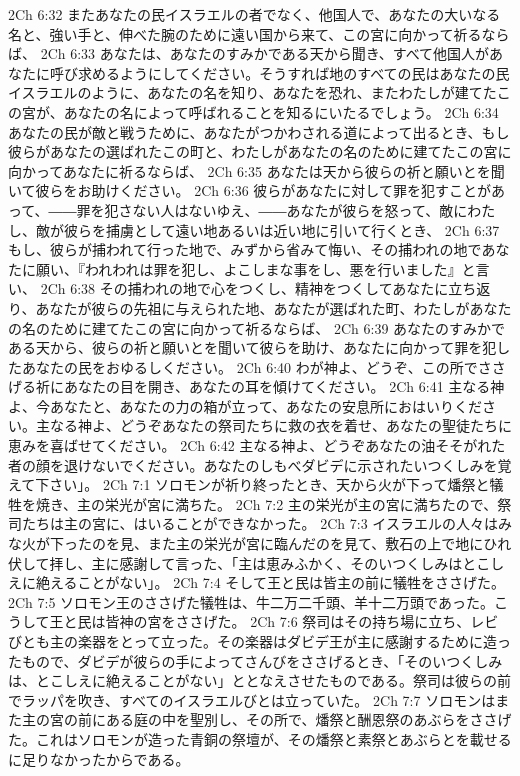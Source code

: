 2Ch 6:32  またあなたの民イスラエルの者でなく、他国人で、あなたの大いなる名と、強い手と、伸べた腕のために遠い国から来て、この宮に向かって祈るならば、
2Ch 6:33  あなたは、あなたのすみかである天から聞き、すべて他国人があなたに呼び求めるようにしてください。そうすれば地のすべての民はあなたの民イスラエルのように、あなたの名を知り、あなたを恐れ、またわたしが建てたこの宮が、あなたの名によって呼ばれることを知るにいたるでしょう。
2Ch 6:34  あなたの民が敵と戦うために、あなたがつかわされる道によって出るとき、もし彼らがあなたの選ばれたこの町と、わたしがあなたの名のために建てたこの宮に向かってあなたに祈るならば、
2Ch 6:35  あなたは天から彼らの祈と願いとを聞いて彼らをお助けください。
2Ch 6:36  彼らがあなたに対して罪を犯すことがあって、――罪を犯さない人はないゆえ、――あなたが彼らを怒って、敵にわたし、敵が彼らを捕虜として遠い地あるいは近い地に引いて行くとき、
2Ch 6:37  もし、彼らが捕われて行った地で、みずから省みて悔い、その捕われの地であなたに願い、『われわれは罪を犯し、よこしまな事をし、悪を行いました』と言い、
2Ch 6:38  その捕われの地で心をつくし、精神をつくしてあなたに立ち返り、あなたが彼らの先祖に与えられた地、あなたが選ばれた町、わたしがあなたの名のために建てたこの宮に向かって祈るならば、
2Ch 6:39  あなたのすみかである天から、彼らの祈と願いとを聞いて彼らを助け、あなたに向かって罪を犯したあなたの民をおゆるしください。
2Ch 6:40  わが神よ、どうぞ、この所でささげる祈にあなたの目を開き、あなたの耳を傾けてください。
2Ch 6:41  主なる神よ、今あなたと、あなたの力の箱が立って、あなたの安息所におはいりください。主なる神よ、どうぞあなたの祭司たちに救の衣を着せ、あなたの聖徒たちに恵みを喜ばせてください。
2Ch 6:42  主なる神よ、どうぞあなたの油そそがれた者の顔を退けないでください。あなたのしもべダビデに示されたいつくしみを覚えて下さい」。
2Ch 7:1  ソロモンが祈り終ったとき、天から火が下って燔祭と犠牲を焼き、主の栄光が宮に満ちた。
2Ch 7:2  主の栄光が主の宮に満ちたので、祭司たちは主の宮に、はいることができなかった。
2Ch 7:3  イスラエルの人々はみな火が下ったのを見、また主の栄光が宮に臨んだのを見て、敷石の上で地にひれ伏して拝し、主に感謝して言った、「主は恵みふかく、そのいつくしみはとこしえに絶えることがない」。
2Ch 7:4  そして王と民は皆主の前に犠牲をささげた。
2Ch 7:5  ソロモン王のささげた犠牲は、牛二万二千頭、羊十二万頭であった。こうして王と民は皆神の宮をささげた。
2Ch 7:6  祭司はその持ち場に立ち、レビびとも主の楽器をとって立った。その楽器はダビデ王が主に感謝するために造ったもので、ダビデが彼らの手によってさんびをささげるとき、「そのいつくしみは、とこしえに絶えることがない」ととなえさせたものである。祭司は彼らの前でラッパを吹き、すべてのイスラエルびとは立っていた。
2Ch 7:7  ソロモンはまた主の宮の前にある庭の中を聖別し、その所で、燔祭と酬恩祭のあぶらをささげた。これはソロモンが造った青銅の祭壇が、その燔祭と素祭とあぶらとを載せるに足りなかったからである。
